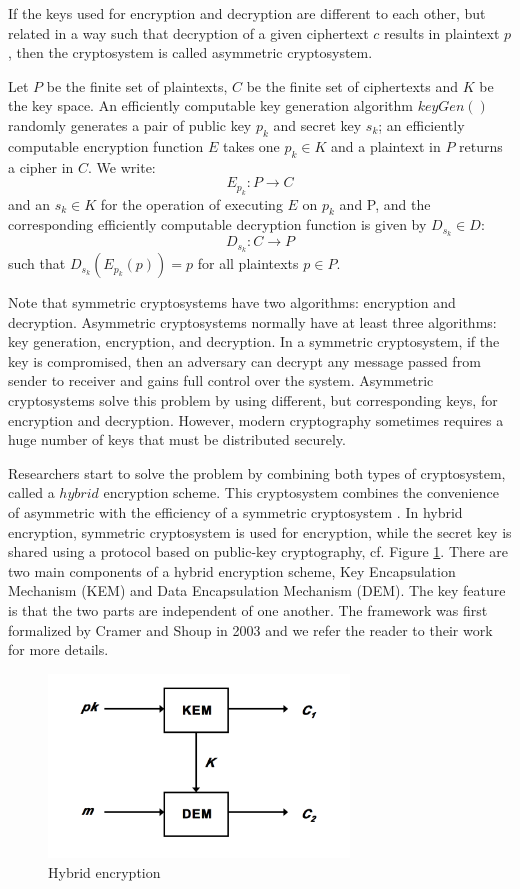 If the keys used for encryption and decryption are different to each other, but related in a way such that  decryption of a given ciphertext $c$ results in plaintext $p$, then the cryptosystem is called asymmetric cryptosystem.

\begin{mydef} 
	Let $P$ be the finite set of plaintexts, $C$ be the finite set of ciphertexts and $K$ be the key space. An efficiently computable key generation algorithm $keyGen()$ randomly generates a pair of public key $p_{k}$ and secret key $s_{k}$; an efficiently computable encryption function 
	$E$ takes one $p_{k} \in K$ and a plaintext in $P$ returns a cipher in $C$. We write: $$E_{p_{k}} : P \rightarrow C $$ and an $s_{k} \in K$ for the operation of executing $E$ on $p_{k}$ and P, and the corresponding efficiently computable decryption function is given by $D_{s_{k}} \in D$: $$ D_{s_{k}} : C \rightarrow P$$ such that $D_{s_{k}}(E_{p_{k}}(p)) = p $ for all plaintexts $p \in P$.
\end{mydef}
Note that symmetric cryptosystems have two algorithms: encryption and decryption. Asymmetric cryptosystems normally have at least three algorithms: key generation, encryption, and decryption. In a symmetric cryptosystem, if the key is compromised, then an adversary can decrypt any message passed from sender to receiver and gains full control over the system. Asymmetric cryptosystems solve this problem by using different, but corresponding keys, for encryption and decryption. However, modern cryptography sometimes requires a huge number of keys that must be distributed securely. 

Researchers start to solve the problem by combining both types of cryptosystem, called a $hybrid$ encryption scheme. This cryptosystem combines the convenience of asymmetric with the efficiency of a symmetric cryptosystem \cite{simmons1992contemporary}. In hybrid encryption, symmetric cryptosystem is used for encryption, while the secret key is shared using a protocol based on public-key cryptography, cf. Figure \ref{hybird}. There are two main components of a hybrid encryption scheme, Key Encapsulation Mechanism (KEM) and Data Encapsulation Mechanism (DEM). The key feature is that the two parts are independent of one another. The framework was first formalized by Cramer and Shoup in 2003 and we refer the reader to their work \cite{cramer2003design} for more details.
\begin{figure}[h!]
	\centering
	\includegraphics[width=80mm]{./pics/HybridEnc.png}
	\caption{Hybrid encryption}
	\label{hybird}
\end{figure}
